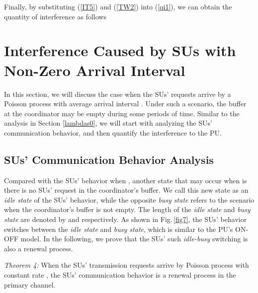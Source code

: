 \documentclass[11pt,draftcls]{IEEEtran}{\onecolumn}
\begin{document}
Finally, by substituting (\ref{IT5}) and (\ref{TW2}) into
(\ref{qi1}), we can obtain the quantity of interference  as
follows


\section{Interference Caused by SUs with Non-Zero Arrival
Interval}\label{lambdasn0}

In this section, we will discuss the case when the SUs' requests
arrive by a Poisson process with average arrival interval . Under such a scenario, the buffer at the coordinator may be
empty during some periods of time. Similar to the analysis in
Section \ref{lambdas0}, we will start with analyzing the SUs'
communication behavior, and then quantify the interference to the
PU.

\subsection{SUs' Communication Behavior Analysis}

Compared with the SUs' behavior when , another state
that may occur when  is there is no SUs' request in
the coordinator's buffer. We call this new state as an \emph{idle
state} of the SUs' behavior, while the opposite \emph{busy state}
refers to the scenario when the coordinator's buffer is not empty.
The length of the \emph{idle state} and \emph{busy state} are
denoted by  and  respectively. As shown in
Fig.\,\ref{fig7}, the SUs' behavior switches between the \emph{idle
state} and \emph{busy state}, which is similar to the PU's ON-OFF
model. In the following, we prove that the SUs' such
\emph{idle-busy} switching is also a renewal process.

\emph{Theorem 4:} When the SUs' transmission requests arrive by
Poisson process with constant rate , the SUs'
communication behavior is a renewal process in the primary channel.
\end{document}

